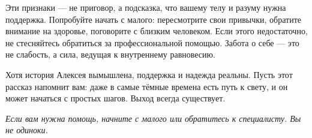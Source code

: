 \documentclass[12pt,a4paper]{book}
\begin{document}
Эти признаки — не приговор, а подсказка, что вашему телу и разуму нужна поддержка. Попробуйте начать с малого: пересмотрите свои привычки, обратите внимание на здоровье, поговорите с близким человеком. Если этого недостаточно, не стесняйтесь обратиться за профессиональной помощью. Забота о себе — это не слабость, а сила, ведущая к внутреннему равновесию.

Хотя история Алексея вымышлена, поддержка и надежда реальны. Пусть этот рассказ напомнит вам: даже в самые тёмные времена есть путь к свету, и он может начаться с простых шагов. Выход всегда существует.

\bigskip
\textit{Если вам нужна помощь, начните с малого или обратитесь к специалисту. Вы не одиноки.}
\end{document}
